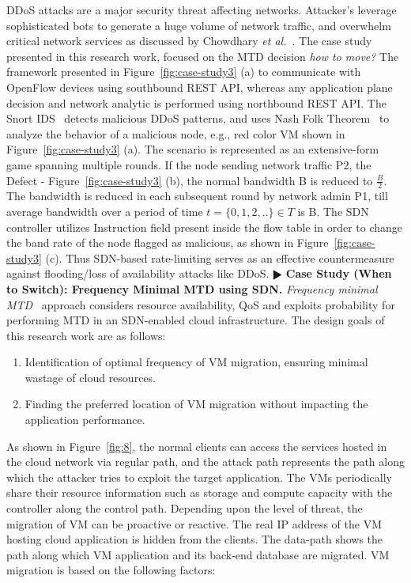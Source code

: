DDoS attacks are a major security threat affecting networks. Attacker's leverage sophisticated bots to generate a huge volume of network traffic, and overwhelm critical network services as discussed by Chowdhary \textit{et al.}~. The case study presented in this research work, focused on the MTD decision {\em how to move?} The framework presented in Figure~\ref{fig:case-study3} (a) to communicate with OpenFlow devices using southbound REST API, whereas any application plane decision and network analytic is performed using northbound REST API.
The Snort IDS~ detects malicious DDoS patterns, and uses Nash Folk Theorem~ to analyze the behavior of a malicious node, e.g., red color VM shown in Figure~\ref{fig:case-study3} (a). The scenario is represented as an extensive-form game spanning multiple rounds. If the node sending network traffic P2, the Defect - Figure~\ref{fig:case-study3} (b), the normal bandwidth B is reduced to $\frac{B}{2}$. The bandwidth is reduced in each subsequent round by network admin P1, till average bandwidth over a period of time $t=\{0,1,2,..\} \in T$ is B.
The SDN controller utilizes Instruction field present inside the flow table in order to change the band rate of the node flagged as malicious, as shown in Figure~\ref{fig:case-study3} (c). Thus SDN-based rate-limiting serves as an effective countermeasure against flooding/loss of availability attacks like DDoS.
\noindent $\RHD$ \textbf{Case Study (When to Switch): Frequency Minimal MTD using SDN.}
\emph{Frequency minimal MTD}~ approach considers resource availability, QoS and exploits probability for performing MTD in an SDN-enabled cloud infrastructure. The design goals of this research work are as follows:
\begin{enumerate}
    \item Identification of optimal frequency of VM migration, ensuring minimal wastage of cloud resources.
    \item Finding the preferred location of VM migration without impacting the application performance. 
\end{enumerate}
As shown in Figure~\ref{fig:8}, the normal clients can access the services hosted in the cloud network via regular path, and the attack path represents the path along which the attacker tries to exploit the target application. The VMs periodically share their resource information such as storage and compute capacity with the controller along the control path. Depending upon the level of threat, the migration of VM can be proactive or reactive. The real IP address of the VM hosting cloud application is hidden from the clients. The data-path shows the path along which VM application and its back-end database are migrated. VM migration is based on the following factors:
